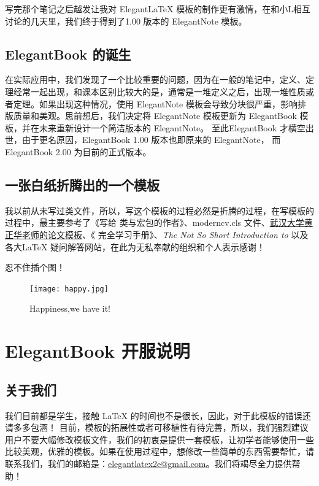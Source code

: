 \documentclass[color=green,mathpazo,titlestyle=hang,11pt]{elegantbook}
\begin{document}
写完那个笔记之后越发让我对 Elegant\LaTeX{} 模板的制作更有激情，在和小L相互讨论的几天里，我们终于得到了1.00 版本的 ElegantNote 模板。

\section{ElegantBook 的诞生}

在实际应用中，我们发现了一个比较重要的问题，因为在一般的笔记中，定义、定理经常一起出现，和课本区别比较大的是，通常是一堆定义之后，出现一堆性质或者定理。如果出现这种情况，使用 ElegantNote 模板会导致分块很严重，影响排版质量和美观。思前想后，我们决定将 ElegantNote 模板更新为 ElegantBook 模板，并在未来重新设计一个简洁版本的 ElegantNote。 至此ElegantBook 才横空出世，由于更名原因，ElegantBook 1.00 版本也即原来的 ElegantNote， 而ElegantBook 2.00 为目前的正式版本。

\section{一张白纸折腾出的一个模板}

我以前从未写过类文件，所以，写这个模板的过程必然是折腾的过程，在写模板的过程中，最主要参考了《写给\LaTeXe{} 类与宏包的作者》\cite{packagewriter}、moderncv.cls 文件、\href{http://aff.whu.edu.cn/huangzh/}{武汉大学黄正华老师的论文模板}、《\LaTeXe{} 完全学习手册》\cite{complete}、{\itshape The Not So Short Introduction to \LaTeXe{}}\cite{oetiker2010not}以及各大\LaTeX{} 疑问解答网站，在此为无私奉献的组织和个人表示感谢！

{\color{thid}忍不住插个图！}

\begin{figure}[!hbtp]
\texttt{[image: happy.jpg]}
\caption{Happiness,we have it!\label{figur:happy}}
\end{figure}

\chapter{ElegantBook 开服说明}
\section{关于我们}
 我们目前都是学生，接触 \LaTeX{} 的时间也不是很长，因此，对于此模板的错误还请多多包涵！ 目前，模板的拓展性或者可移植性有待完善，所以，我们强烈建议用户不要大幅修改模板文件，我们的初衷是提供一套模板，让初学者能够使用一些比较美观，优雅的模板。如果在使用过程中，想修改一些简单的东西需要帮忙，请联系我们，我们的邮箱是：\href{elegantlatex2e@gmail.com}{elegantlatex2e@gmail.com}。我们将竭尽全力提供帮助！
\end{document}
